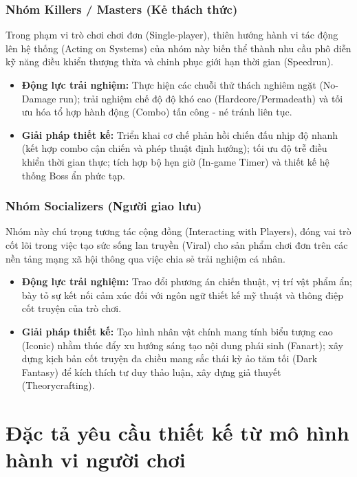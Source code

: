 \documentclass[../DoAn.tex]{subfiles}
\begin{document}
\subsubsection{Nhóm Killers / Masters (Kẻ thách thức)}
Trong phạm vi trò chơi chơi đơn (Single-player), thiên hướng hành vi tác động lên hệ thống (Acting on Systems) của nhóm này biến thể thành nhu cầu phô diễn kỹ năng điều khiển thượng thừa và chinh phục giới hạn thời gian (Speedrun).
\begin{itemize}
    \item \textbf{Động lực trải nghiệm:} Thực hiện các chuỗi thử thách nghiêm ngặt (No-Damage run); trải nghiệm chế độ độ khó cao (Hardcore/Permadeath) và tối ưu hóa tổ hợp hành động (Combo) tấn công - né tránh liên tục.
    \item \textbf{Giải pháp thiết kế:} Triển khai cơ chế phản hồi chiến đấu nhịp độ nhanh (kết hợp combo cận chiến và phép thuật định hướng); tối ưu độ trễ điều khiển thời gian thực; tích hợp bộ hẹn giờ (In-game Timer) và thiết kế hệ thống Boss ẩn phức tạp.
\end{itemize}

\subsubsection{Nhóm Socializers (Người giao lưu)}
Nhóm này chú trọng tương tác cộng đồng (Interacting with Players), đóng vai trò cốt lõi trong việc tạo sức sống lan truyền (Viral) cho sản phẩm chơi đơn trên các nền tảng mạng xã hội thông qua việc chia sẻ trải nghiệm cá nhân.
\begin{itemize}
    \item \textbf{Động lực trải nghiệm:} Trao đổi phương án chiến thuật, vị trí vật phẩm ẩn; bày tỏ sự kết nối cảm xúc đối với ngôn ngữ thiết kế mỹ thuật và thông điệp cốt truyện của trò chơi.
    \item \textbf{Giải pháp thiết kế:} Tạo hình nhân vật chính mang tính biểu tượng cao (Iconic) nhằm thúc đẩy xu hướng sáng tạo nội dung phái sinh (Fanart); xây dựng kịch bản cốt truyện đa chiều mang sắc thái kỳ ảo tăm tối (Dark Fantasy) để kích thích tư duy thảo luận, xây dựng giả thuyết (Theorycrafting).
\end{itemize}

\section{Đặc tả yêu cầu thiết kế từ mô hình hành vi người chơi}
\label{section:2.3}
\end{document}
